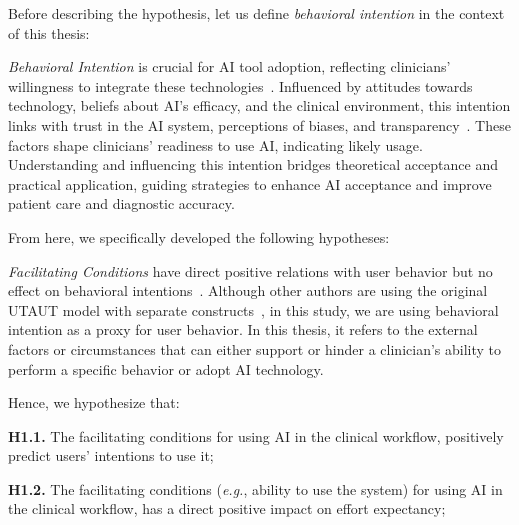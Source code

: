 \vspace{2.00mm}

\noindent
Before describing the hypothesis, let us define {\it behavioral intention} in the context of this thesis:

\vspace{2.00mm}

\textcolor{revised}{{\it Behavioral Intention} is crucial for \ac{AI} tool adoption, reflecting clinicians' willingness to integrate these technologies~\cite{doi:10.1057/ejis.2012.15}.
Influenced by attitudes towards technology, beliefs about \ac{AI}'s efficacy, and the clinical environment, this intention links with trust in the \ac{AI} system, perceptions of biases, and transparency~\cite{Venkatesh2022}.
These factors shape clinicians' readiness to use \ac{AI}, indicating likely usage.
Understanding and influencing this intention bridges theoretical acceptance and practical application, guiding strategies to enhance \ac{AI} acceptance and improve patient care and diagnostic accuracy.}


\noindent
From here, we specifically developed the following hypotheses:

\vspace{2.00mm}

\textcolor{revised}{{\it Facilitating Conditions} have direct positive relations with user behavior but no effect on behavioral intentions~\cite{CALISTO2022102922}.
Although other authors are using the original \ac{UTAUT} model with separate constructs~\cite{KHALILZADEH2017460}, in this study, we are using behavioral intention as a proxy for user behavior.
In this thesis, it refers to the external factors or circumstances that can either support or hinder a clinician's ability to perform a specific behavior or adopt \ac{AI} technology.}

\vspace{2.00mm}

\noindent
Hence, we hypothesize that:

\vspace{2.00mm}

\noindent
{\bf H1.1.} The facilitating conditions for using \ac{AI} in the clinical workflow, positively predict users' intentions to use it;

\vspace{2.00mm}

\noindent
{\bf H1.2.} The facilitating conditions ({\it e.g.}, ability to use the system) for using \ac{AI} in the clinical workflow, has a direct positive impact on effort expectancy;

